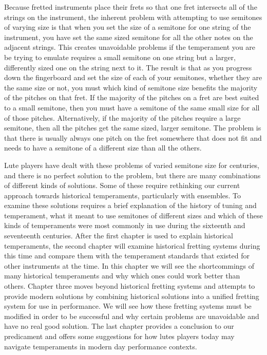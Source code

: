 Because fretted instruments place their frets so that one fret intersects all of the
strings on the instrument, the inherent problem with attempting to use semitones of
varying size is that when you set the size of a semitone for one string of the instrument,
you have set the same sized semitone for all the other notes on the adjacent strings. This
creates unavoidable problems if the temperament you are be trying to emulate requires a
small semitone on one string but a larger, differently sized one on the string next to it.
 The result is that as you progress down the fingerboard and set the size of each of your
semitones, whether they are the same size or not, you must which kind of semitone size
benefits the majority of the pitches on that fret. \autocite[120]{RD:1} If the majority of
the pitches on a fret are best suited to a small semitone, then you must have a semitone
of the same small size for all of those pitches. Alternatively, if the majority of the
pitches require a large semitone, then all the pitches get the same sized, larger
semitone.  The problem is that there is usually always one pitch on the fret somewhere
that does not fit and needs to have a semitone of a different size than all the others.

Lute players have dealt with these problems of varied semitone size for centuries, and
there is no perfect solution to the problem, but there are many combinations of different
kinds of solutions.  Some of these require rethinking our current approach towards
historical temperaments, particularly with ensembles.  To examine these solutions requires
a brief explanation of the history of tuning and temperament, what it meant to use
semitones of different sizes and which of these kinds of temperaments were most commonly
in use during the sixteenth and seventeenth centuries. After the first chapter is used to
explain historical temperaments, the second chapter will examine historical fretting
systems during this time and compare them with the temperament standards that existed for
other instruments at the time.  In this chapter we will see the shortcommings of many
historical temperaments and why which ones could work better than others. Chapter three
moves beyond historical fretting systems and attempts to provide modern solutions by
combining historical solutions into a unified fretting system for use in performance.  We
will see how these fretting systems must be modified in order to be successful and why
certain problems are unavoidable and have no real good solution. The last chapter provides
a conclusion to our predicament and offers some suggestions for how lutes players today
may navigate temperaments in modern day performance contexts. \autocite[130]{RD:1}
